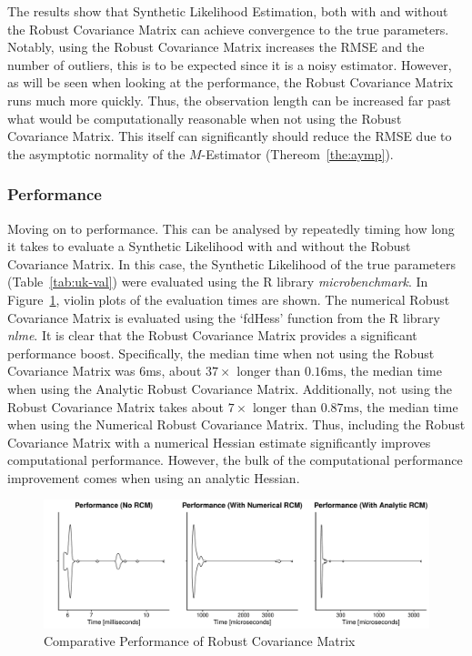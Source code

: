The results show that Synthetic Likelihood Estimation, both with and without the Robust Covariance Matrix can achieve convergence to the true parameters. Notably, using the Robust Covariance Matrix increases the RMSE and the number of outliers, this is to be expected since it is a noisy estimator. However, as will be seen when looking at the performance, the Robust Covariance Matrix runs much more quickly. Thus, the observation length can be increased far past what would be computationally reasonable when not using the Robust Covariance Matrix. This itself can significantly should reduce the RMSE due to the asymptotic normality of the $M$-Estimator (Thereom~\ref{the:aymp}).

\subsubsection{Performance}
\label{subsec:perf}

Moving on to performance. This can be analysed by repeatedly timing how long it takes to evaluate a Synthetic Likelihood with and without the Robust Covariance Matrix. In this case, the Synthetic Likelihood of the true parameters (Table~\ref{tab:uk-val}) were evaluated using the R library \emph{microbenchmark}. In Figure~\ref{fig:ss-perf}, violin plots of the evaluation times are shown. The numerical Robust Covariance Matrix is evaluated using the `fdHess' function from the R library \emph{nlme}. It is clear that the Robust Covariance Matrix provides a significant performance boost. Specifically, the median time when not using the Robust Covariance Matrix was $6$ms, about $37\times$ longer than $0.16\text{ms}$, the median time when using the Analytic Robust Covariance Matrix. Additionally, not using the Robust Covariance Matrix takes about $7\times$ longer than $0.87\text{ms}$, the median time when using the Numerical Robust Covariance Matrix. Thus, including the Robust Covariance Matrix with a numerical Hessian estimate significantly improves computational performance. However, the bulk of the computational performance improvement comes when using an analytic Hessian.

\begin{figure}[H]
        \centering
        \includegraphics[width=12cm]{images/fitting/simple_model/perf.pdf}
        \caption{Comparative Performance of Robust Covariance Matrix}
        \label{fig:ss-perf}
\end{figure}

